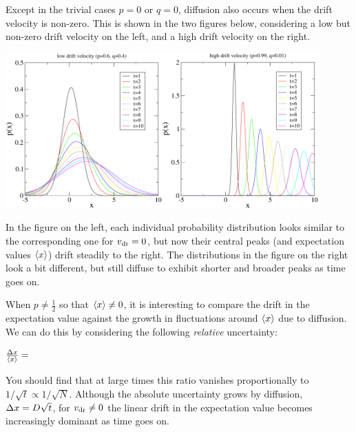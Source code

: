 Except in the trivial cases $p = 0$ or $q = 0$, diffusion also occurs when the drift velocity is non-zero.
This is shown in the two figures below, considering a low but non-zero drift velocity on the left, and a high drift velocity on the right.
\begin{center} %
  \includegraphics[width=0.45\textwidth]{figs/unit01_diff_low.pdf}\hfill \includegraphics[width=0.45\textwidth]{figs/unit01_diff_high.pdf}
\end{center}
In the figure on the left, each individual probability distribution looks similar to the corresponding one for $v_{\mathrm{dr}} = 0$, but now their central peaks (and expectation values $\left\langle x \right\rangle$) drift steadily to the right.
The distributions in the figure on the right look a bit different, but still diffuse to exhibit shorter and broader peaks as time goes on.

When $p \neq \frac{1}{2}$ so that $\left\langle x \right\rangle \neq 0$, it is interesting to compare the drift in the expectation value against the growth in fluctuations around $\left\langle x \right\rangle$ due to diffusion.
We can do this by considering the following \textit{relative} uncertainty:
\begin{mdframed}
  $\frac{\Delta x}{\left\langle x \right\rangle} = $ \\[100 pt]
\end{mdframed}
You should find that at large times this ratio vanishes proportionally to $1 / \sqrt{t} \propto 1 / \sqrt{N}$.
Although the absolute uncertainty grows by diffusion, $\Delta x = D \sqrt{t}$, for $v_{\mathrm{dr}} \neq 0$ the linear drift in the expectation value becomes increasingly dominant as time goes on.



